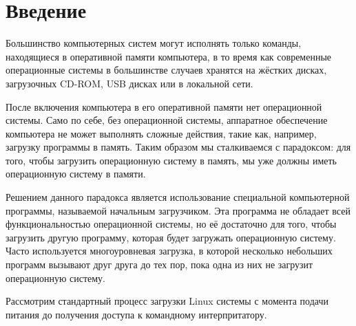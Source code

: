 \newpage
\section*{Введение}

Большинство компьютерных систем могут исполнять только команды, находящиеся в оперативной памяти компьютера, в то время как современные операционные системы в большинстве случаев хранятся на жёстких дисках, загрузочных CD-ROM, USB дисках или в локальной сети.

После включения компьютера в его оперативной памяти нет операционной системы. Само по себе, без операционной системы, аппаратное обеспечение компьютера не может выполнять сложные действия, такие как, например, загрузку программы в память. Таким образом мы сталкиваемся с парадоксом: для того, чтобы загрузить операционную систему в память, мы уже должны иметь операционную систему в памяти.

Решением данного парадокса является использование специальной компьютерной программы, называемой начальным загрузчиком. Эта программа не обладает всей функциональностью операционной системы, но её достаточно для того, чтобы загрузить другую программу, которая будет загружать операционную систему. Часто используется многоуровневая загрузка, в которой несколько небольших программ вызывают друг друга до тех пор, пока одна из них не загрузит операционную систему.

Рассмотрим стандартный процесс загрузки Linux системы с момента подачи питания до получения доступа к командному интерпритатору.
